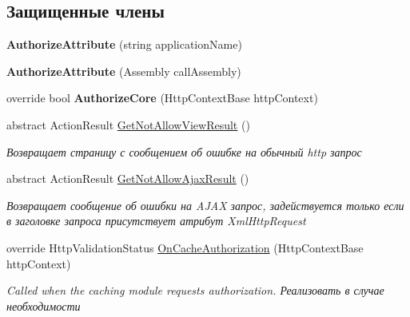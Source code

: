 \subsection*{Защищенные члены}
\begin{DoxyCompactItemize}
\item 
\mbox{\label{class_security_1_1_web_1_1_mvc_1_1_authorize_attribute_a7291b9af182ab5b7437ca6c8c4935af4}} 
{\bfseries Authorize\+Attribute} (string application\+Name)
\item 
\mbox{\label{class_security_1_1_web_1_1_mvc_1_1_authorize_attribute_a07769e4ae4f7aa1d86083ede194da833}} 
{\bfseries Authorize\+Attribute} (Assembly call\+Assembly)
\item 
\mbox{\label{class_security_1_1_web_1_1_mvc_1_1_authorize_attribute_ac7b8810d26197ea93667aafe8e51a583}} 
override bool {\bfseries Authorize\+Core} (Http\+Context\+Base http\+Context)
\item 
abstract Action\+Result \hyperlink{class_security_1_1_web_1_1_mvc_1_1_authorize_attribute_a43392ad3d231ebb4f2e6aff6fe177029}{Get\+Not\+Allow\+View\+Result} ()
\begin{DoxyCompactList}\small\item\em Возвращает страницу с сообщением об ошибке на обычный http запрос \end{DoxyCompactList}\item 
abstract Action\+Result \hyperlink{class_security_1_1_web_1_1_mvc_1_1_authorize_attribute_a380e0f412224bcd403e951faf3bae577}{Get\+Not\+Allow\+Ajax\+Result} ()
\begin{DoxyCompactList}\small\item\em Возвращает сообщение об ошибки на A\+J\+AX запрос, задействуется только если в заголовке запроса присутствует атрибут Xml\+Http\+Request \end{DoxyCompactList}\item 
override Http\+Validation\+Status \hyperlink{class_security_1_1_web_1_1_mvc_1_1_authorize_attribute_a4f2d79c5650a37b2ca66c70924cce936}{On\+Cache\+Authorization} (Http\+Context\+Base http\+Context)
\begin{DoxyCompactList}\small\item\em Called when the caching module requests authorization. Реализовать в случае необходимости \end{DoxyCompactList}\end{DoxyCompactItemize}
